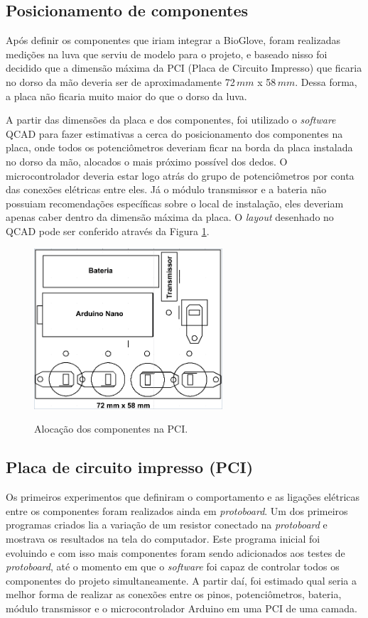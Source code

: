 \documentclass[
	12pt,				%
	openright,			%
	oneside,			%
	a4paper,			%
	english,			%
	brazil				%
	]{abntex2}
\begin{document}
			\subsection{Posicionamento de componentes}

			Após definir os componentes que iriam integrar a BioGlove, foram realizadas medições na luva que serviu de modelo para o projeto, e baseado nisso foi decidido que a dimensão máxima da PCI (Placa de Circuito Impresso) que ficaria no dorso da mão deveria ser de aproximadamente 72$\,mm$ x 58$\,mm$. Dessa forma, a placa não ficaria muito maior do que o dorso da luva. 
			
			A partir das dimensões da placa e dos componentes, foi utilizado o \textit{software} QCAD para fazer estimativas a cerca do posicionamento dos componentes na placa, onde todos os potenciômetros deveriam ficar na borda da placa instalada no dorso da mão, alocados o mais próximo possível dos dedos. O microcontrolador deveria estar logo atrás do grupo de potenciômetros por conta das conexões elétricas entre eles. Já o módulo transmissor e a bateria não possuiam recomendações específicas sobre o local de instalação, eles deveriam apenas caber dentro da dimensão máxima da placa. O \textit{layout} desenhado no QCAD pode ser conferido através da Figura \ref{Fig:size-glove-module1}.

		\begin{figure}[h!]
			\centering
			\caption{Alocação dos componentes na PCI.}
  		\includegraphics[width=7cm]{figures/size-glove-module1.png}
  		\label{Fig:size-glove-module1}
		\end{figure}


			\subsection{Placa de circuito impresso (PCI)}

			Os primeiros experimentos que definiram o comportamento e as ligações elétricas entre os componentes foram realizados ainda em \textit{protoboard}. Um dos primeiros programas criados lia a variação de um resistor conectado na \textit{protoboard} e mostrava os resultados na tela do computador. Este programa inicial foi evoluindo e com isso mais componentes foram sendo adicionados aos testes de \textit{protoboard}, até o momento em que o \textit{software} foi capaz de controlar todos os componentes do projeto simultaneamente. A partir daí, foi estimado  qual seria a melhor forma de realizar as conexões entre os pinos, potenciômetros, bateria, módulo transmissor e o microcontrolador Arduino em uma PCI de uma camada.
\end{document}
